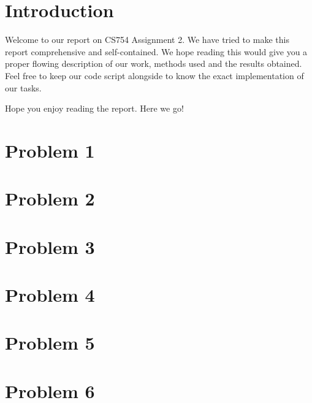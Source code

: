 \documentclass[a4paper,11pt]{article}
\numberwithin{definition}{section}
\numberwithin{mytheorem}{subsection}
\begin{document}

\date{Spring 2022}
\maketitle

\justifying
\tableofcontents

\newpage
\justifying
\section*{Introduction}

Welcome  to our report on CS754 Assignment 2. We have tried to make this report comprehensive and self-contained. We hope reading this would give you a proper flowing description of our work, methods used and the results obtained. Feel free to keep our code script alongside to know the exact implementation of our tasks. 

Hope you enjoy reading the report. Here we go!


\section{Problem 1}




\section{Problem 2}




\section{Problem 3}




\section{Problem 4}




\section{Problem 5}




\section{Problem 6}
\end{document}
